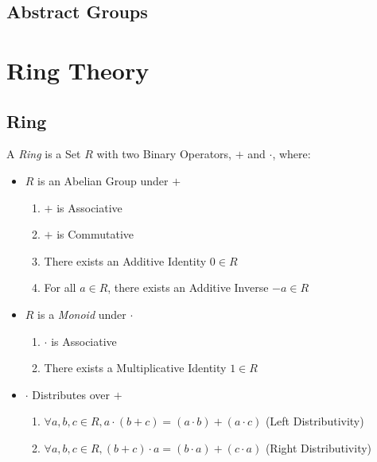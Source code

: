 \subsection{Abstract Groups}\label{sec:abstract_groups}



\section{Ring Theory}\label{sec:ring_theory}

\subsection{Ring}\label{sec:ring}

A \emph{Ring} is a Set $R$ with two Binary Operators, $+$ and
$\cdot$, where:

\begin{itemize}
\item $R$ is an Abelian Group under $+$
    \begin{enumerate}
        \item $+$ is Associative
        \item $+$ is Commutative
        \item There exists an Additive Identity $0 \in R$
        \item For all $a \in R$, there exists an Additive Inverse $-a
          \in R$
    \end{enumerate}
\item $R$ is a \emph{Monoid} under $\cdot$
    \begin{enumerate}
        \item $\cdot$ is Associative
        \item There exists a Multiplicative Identity $1 \in R$
    \end{enumerate}
\item $\cdot$ Distributes over $+$
    \begin{enumerate}
        \item $\forall a,b,c \in R,
            a \cdot (b + c) = (a \cdot b) + (a \cdot c)$
            (Left Distributivity)
        \item $\forall a,b,c \in R,
            (b + c) \cdot a = (b \cdot a) + (c \cdot a)$
            (Right Distributivity)
    \end{enumerate}
\end{itemize}

